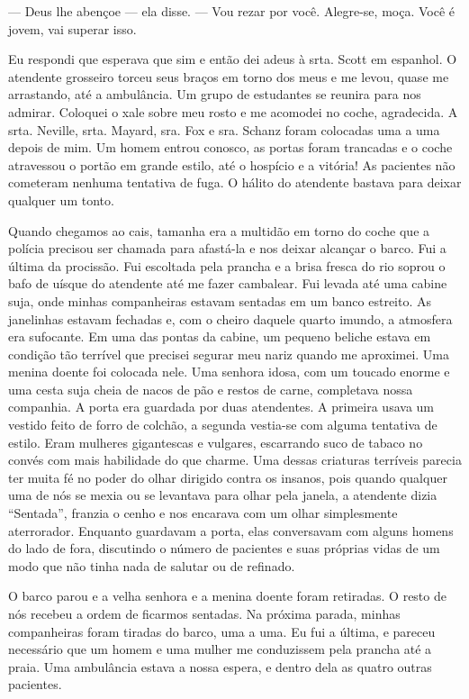 --- Deus lhe abençoe --- ela disse. --- Vou
rezar por você. Alegre-se, moça. Você é jovem, vai superar isso. 

Eu respondi que esperava que sim e então dei adeus à srta. Scott em
espanhol. O atendente grosseiro torceu seus braços em torno dos meus e
me levou, quase me arrastando, até a ambulância. Um grupo de estudantes se
reunira para nos admirar. Coloquei o xale sobre meu rosto e me acomodei
no coche, agradecida. A srta. Neville, srta. Mayard, sra. Fox e sra.
Schanz foram colocadas uma a uma depois de mim. Um homem entrou conosco,
as portas foram trancadas e o coche atravessou o portão em grande
estilo, até o hospício e a vitória! As pacientes não cometeram nenhuma
tentativa de fuga. O hálito do atendente bastava para deixar qualquer um
tonto.

Quando chegamos ao cais, tamanha era a multidão em torno do coche que a
polícia precisou ser chamada para afastá-la e nos deixar alcançar o
barco. Fui a última da procissão. Fui escoltada pela prancha e a brisa
fresca do rio soprou o bafo de uísque do atendente até me fazer
cambalear. Fui levada até uma cabine suja, onde minhas companheiras
estavam sentadas em um banco estreito. As janelinhas estavam fechadas e,
com o cheiro daquele quarto imundo, a atmosfera era sufocante. Em uma
das pontas da cabine, um pequeno beliche estava em condição tão terrível
que precisei segurar meu nariz quando me aproximei. Uma menina doente
foi colocada nele. Uma senhora idosa, com um toucado enorme e uma cesta
suja cheia de nacos de pão e restos de carne, completava nossa
companhia. A porta era guardada por duas atendentes. A primeira usava um
vestido feito de forro de colchão, a segunda vestia-se com alguma tentativa de
estilo. Eram mulheres gigantescas e vulgares, escarrando suco de tabaco
no convés com mais habilidade do que charme. Uma dessas criaturas
terríveis parecia ter muita fé no poder do olhar dirigido contra os
insanos, pois quando qualquer uma de nós se mexia ou se levantava para
olhar pela janela, a atendente dizia ``Sentada'', franzia o cenho e nos
encarava com um olhar simplesmente aterrorador. Enquanto guardavam a
porta, elas conversavam com alguns homens do lado de fora, discutindo o
número de pacientes e suas próprias vidas de um modo que não tinha nada
de salutar ou de refinado.

O
barco parou e a velha senhora e a menina doente foram retiradas. O resto
de nós recebeu a ordem de ficarmos sentadas. Na próxima parada, minhas
companheiras foram tiradas do barco, uma a uma. Eu fui a última, e
pareceu necessário que um homem e uma mulher me conduzissem pela prancha
até a praia. Uma ambulância estava a nossa espera, e dentro dela as
quatro outras pacientes.

